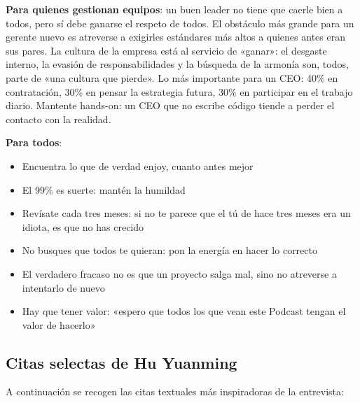 \documentclass[a4paper]{article}
\begin{document}
\textbf{Para quienes gestionan equipos}: un buen leader no tiene que caerle bien a todos, pero sí debe ganarse el respeto de todos. El obstáculo más grande para un gerente nuevo es atreverse a exigirles estándares más altos a quienes antes eran sus pares. La cultura de la empresa está al servicio de «ganar»: el desgaste interno, la evasión de responsabilidades y la búsqueda de la armonía son, todos, parte de «una cultura que pierde». Lo más importante para un CEO: 40\% en contratación, 30\% en pensar la estrategia futura, 30\% en participar en el trabajo diario. Mantente hands-on: un CEO que no escribe código tiende a perder el contacto con la realidad.

\textbf{Para todos}:
\begin{itemize}
\item Encuentra lo que de verdad enjoy, cuanto antes mejor
\item El 99\% es suerte: mantén la humildad
\item Revísate cada tres meses: si no te parece que el tú de hace tres meses era un idiota, es que no has crecido
\item No busques que todos te quieran: pon la energía en hacer lo correcto
\item El verdadero fracaso no es que un proyecto salga mal, sino no atreverse a intentarlo de nuevo
\item Hay que tener valor: «espero que todos los que vean este Podcast tengan el valor de hacerlo»
\end{itemize}

\subsection{Citas selectas de Hu Yuanming}

A continuación se recogen las citas textuales más inspiradoras de la entrevista:
\end{document}
